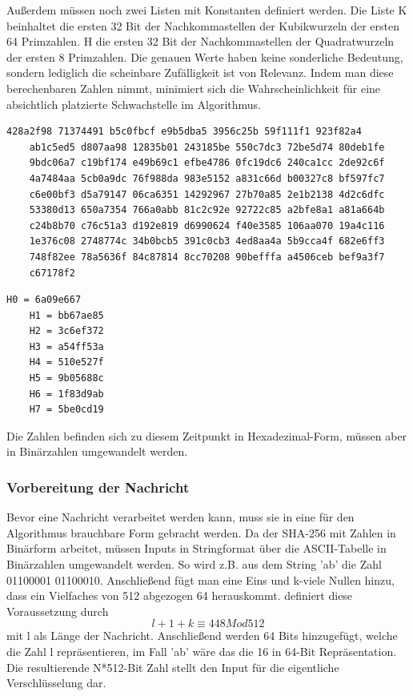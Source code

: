 Außerdem müssen noch zwei Listen mit Konstanten definiert werden. Die Liste K beinhaltet die ersten 32 Bit der Nachkommastellen der Kubikwurzeln der ersten 64 Primzahlen.
H die ersten 32 Bit der Nachkommastellen der Quadratwurzeln der ersten 8 Primzahlen. 
Die genauen Werte haben keine sonderliche Bedeutung, sondern lediglich die scheinbare Zufälligkeit ist von Relevanz. Indem man diese berechenbaren Zahlen nimmt, minimiert sich die Wahrscheinlichkeit für eine absichtlich platzierte Schwachstelle im Algorithmus.
\begin{lstlisting}[caption={Liste K von Konstanten},captionpos=b]
	428a2f98 71374491 b5c0fbcf e9b5dba5 3956c25b 59f111f1 923f82a4 
	ab1c5ed5 d807aa98 12835b01 243185be 550c7dc3 72be5d74 80deb1fe 
	9bdc06a7 c19bf174 e49b69c1 efbe4786 0fc19dc6 240ca1cc 2de92c6f 
	4a7484aa 5cb0a9dc 76f988da 983e5152 a831c66d b00327c8 bf597fc7
	c6e00bf3 d5a79147 06ca6351 14292967 27b70a85 2e1b2138 4d2c6dfc
	53380d13 650a7354 766a0abb 81c2c92e 92722c85 a2bfe8a1 a81a664b 
	c24b8b70 c76c51a3 d192e819 d6990624 f40e3585 106aa070 19a4c116 
	1e376c08 2748774c 34b0bcb5 391c0cb3 4ed8aa4a 5b9cca4f 682e6ff3 
	748f82ee 78a5636f 84c87814 8cc70208 90befffa a4506ceb bef9a3f7 
	c67178f2
\end{lstlisting}
\begin{lstlisting}[caption={Liste H mit den Arbeitsvariablen H0 - H7},captionpos=b]
	H0 = 6a09e667
	H1 = bb67ae85
	H2 = 3c6ef372
	H3 = a54ff53a
	H4 = 510e527f
	H5 = 9b05688c
	H6 = 1f83d9ab
	H7 = 5be0cd19
\end{lstlisting}
Die Zahlen befinden sich zu diesem Zeitpunkt in Hexadezimal-Form, müssen aber in Binärzahlen umgewandelt werden.
\subsubsection{Vorbereitung der Nachricht}
Bevor eine Nachricht verarbeitet werden kann, muss sie in eine für den Algorithmus brauchbare Form gebracht werden. 
Da der SHA-256 mit Zahlen in Binärform arbeitet, müssen Inputs in Stringformat über die ASCII-Tabelle in Binärzahlen umgewandelt werden. So wird z.B. aus dem String 'ab' die Zahl 01100001 01100010.
Anschließend fügt man eine Eins und k-viele Nullen hinzu, dass ein Vielfaches von 512 abgezogen 64 herauskommt. \cite{dang_2015} definiert diese Voraussetzung durch
$$l+1+k \equiv 448 Mod512$$
mit l als Länge der Nachricht. Anschließend werden 64 Bits hinzugefügt, welche die Zahl l repräsentieren, im Fall 'ab' wäre das die 16 in 64-Bit Repräsentation. Die resultierende N*512-Bit Zahl stellt den Input für die eigentliche Verschlüsselung dar.

